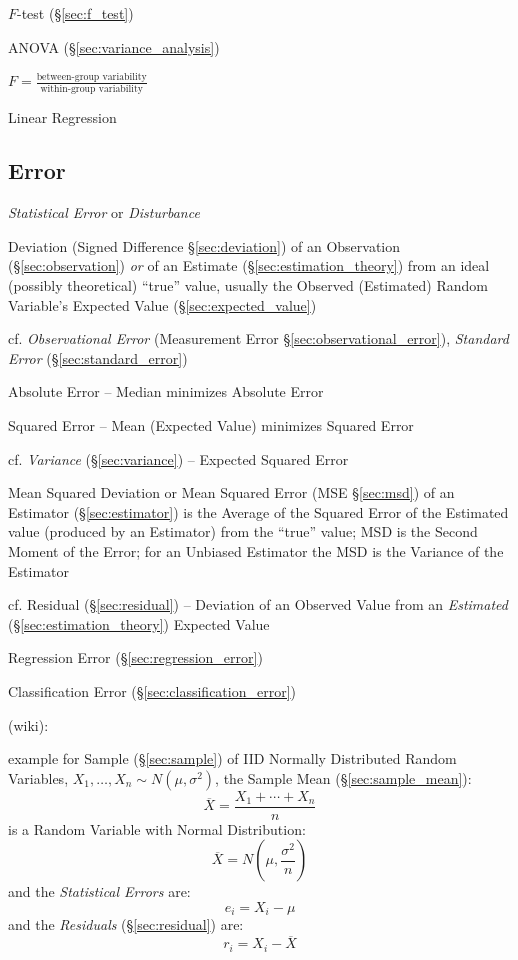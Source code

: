 $F$-test (\S\ref{sec:f_test})

ANOVA (\S\ref{sec:variance_analysis})

$F = \frac{\text{between-group variability}}{\text{within-group variability}}$

Linear Regression



\subsection{Error}\label{sec:error}

\emph{Statistical Error} or \emph{Disturbance}

Deviation (Signed Difference \S\ref{sec:deviation}) of an Observation
(\S\ref{sec:observation}) \emph{or} of an Estimate
(\S\ref{sec:estimation_theory}) from an ideal (possibly theoretical) ``true''
value, usually the Observed (Estimated) Random Variable's Expected Value
(\S\ref{sec:expected_value})

\fist cf. \emph{Observational Error} (Measurement Error
\S\ref{sec:observational_error}), \emph{Standard Error}
  (\S\ref{sec:standard_error})

Absolute Error -- Median minimizes Absolute Error

Squared Error -- Mean (Expected Value) minimizes Squared Error

cf. \emph{Variance} (\S\ref{sec:variance}) -- Expected Squared Error

\fist Mean Squared Deviation or Mean Squared Error (MSE \S\ref{sec:msd}) of an
Estimator (\S\ref{sec:estimator}) is the Average of the Squared Error of the
Estimated value (produced by an Estimator) from the ``true'' value; MSD is
the Second Moment of the Error; for an Unbiased Estimator the MSD is the
Variance of the Estimator

cf. Residual (\S\ref{sec:residual}) -- Deviation of an Observed Value from an
\emph{Estimated} (\S\ref{sec:estimation_theory}) Expected Value

\fist Regression Error (\S\ref{sec:regression_error})

\fist Classification Error (\S\ref{sec:classification_error})

(wiki):

example for Sample (\S\ref{sec:sample}) of IID Normally Distributed Random
Variables, $X_1, \ldots, X_n \sim N(\mu, \sigma^2)$, the Sample Mean
(\S\ref{sec:sample_mean}):
\[
  \overline{X} = \frac{X_1 + \cdots + X_n}{n}
\]
is a Random Variable with Normal Distribution:
\[
  \overline{X} = N(\mu, \frac{\sigma^2}{n})
\]
and the \emph{Statistical Errors} are:
\[
  e_i = X_i - \mu
\]
and the \emph{Residuals} (\S\ref{sec:residual}) are:
\[
  r_i = X_i - \overline{X}
\]



